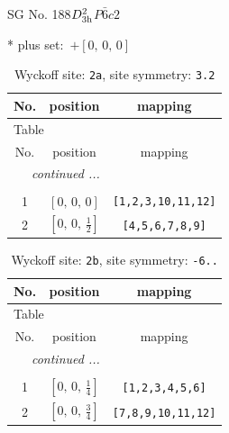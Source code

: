 \documentclass[fleqn,8pt]{jsarticle}
\begin{document}
\setcounter{MaxMatrixCols}{32}

\renewcommand{\tablename}{Table~}
\renewcommand{\figurename}{Figure~}
\begin{center}
\LARGE
SG No. 188\quad$D_{\rm 3h}^{2}$\quad$P\bar{6}c2$\quad[ hexagonal ]
\end{center}
* plus set:\,\,\,$+\left[ 0,\, 0,\, 0 \right]$
\renewcommand{\arraystretch}{1.2}
\begin{longtable}{ccc}
\caption{Wyckoff site: {\tt 2a}, site symmetry: {\tt 3.2}}
 \\
 \hline \hline
No. & position & mapping \\ \hline \endfirsthead

\multicolumn{2}{l}{\tablename\ \thetable{}} \\
 \hline \hline
No. & position & mapping \\ \hline \endhead

 \hline \hline
\multicolumn{2}{r}{\footnotesize\it continued ...} \\ \endfoot

 \hline \hline
\multicolumn{2}{r}{} \\ \endlastfoot

1 & $\left[ 0,\, 0,\, 0 \right]$ & {\tt [1,2,3,10,11,12]} \\ \hline
2 & $\left[ 0,\, 0,\, \frac{1}{2} \right]$ & {\tt [4,5,6,7,8,9]} \\
\end{longtable}
\renewcommand{\arraystretch}{1.2}
\begin{longtable}{ccc}
\caption{Wyckoff site: {\tt 2b}, site symmetry: {\tt -6..}}
 \\
 \hline \hline
No. & position & mapping \\ \hline \endfirsthead

\multicolumn{2}{l}{\tablename\ \thetable{}} \\
 \hline \hline
No. & position & mapping \\ \hline \endhead

 \hline \hline
\multicolumn{2}{r}{\footnotesize\it continued ...} \\ \endfoot

 \hline \hline
\multicolumn{2}{r}{} \\ \endlastfoot

1 & $\left[ 0,\, 0,\, \frac{1}{4} \right]$ & {\tt [1,2,3,4,5,6]} \\ \hline
2 & $\left[ 0,\, 0,\, \frac{3}{4} \right]$ & {\tt [7,8,9,10,11,12]} \\
\end{longtable}
\end{document}
